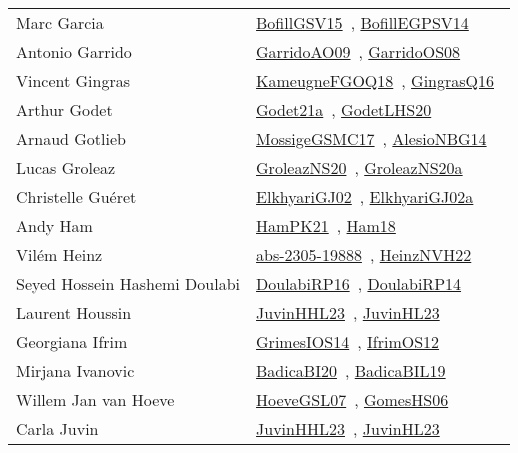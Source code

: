 {\begin{longtable}{p{4cm}p{20cm}}
Marc Garcia & \href{works/BofillGSV15.pdf}{BofillGSV15}~\cite{BofillGSV15}, \href{works/BofillEGPSV14.pdf}{BofillEGPSV14}~\cite{BofillEGPSV14}\\
Antonio Garrido & \href{works/GarridoAO09.pdf}{GarridoAO09}~\cite{GarridoAO09}, \href{works/GarridoOS08.pdf}{GarridoOS08}~\cite{GarridoOS08}\\
Vincent Gingras & \href{works/KameugneFGOQ18.pdf}{KameugneFGOQ18}~\cite{KameugneFGOQ18}, \href{works/GingrasQ16.pdf}{GingrasQ16}~\cite{GingrasQ16}\\
Arthur Godet & \href{}{Godet21a}~\cite{Godet21a}, \href{works/GodetLHS20.pdf}{GodetLHS20}~\cite{GodetLHS20}\\
Arnaud Gotlieb & \href{works/MossigeGSMC17.pdf}{MossigeGSMC17}~\cite{MossigeGSMC17}, \href{works/AlesioNBG14.pdf}{AlesioNBG14}~\cite{AlesioNBG14}\\
Lucas Groleaz & \href{works/GroleazNS20.pdf}{GroleazNS20}~\cite{GroleazNS20}, \href{works/GroleazNS20a.pdf}{GroleazNS20a}~\cite{GroleazNS20a}\\
Christelle Gu{\'{e}}ret & \href{works/ElkhyariGJ02.pdf}{ElkhyariGJ02}~\cite{ElkhyariGJ02}, \href{works/ElkhyariGJ02a.pdf}{ElkhyariGJ02a}~\cite{ElkhyariGJ02a}\\
Andy Ham & \href{works/HamPK21.pdf}{HamPK21}~\cite{HamPK21}, \href{works/Ham18.pdf}{Ham18}~\cite{Ham18}\\
Vil{\'{e}}m Heinz & \href{works/abs-2305-19888.pdf}{abs-2305-19888}~\cite{abs-2305-19888}, \href{works/HeinzNVH22.pdf}{HeinzNVH22}~\cite{HeinzNVH22}\\
Seyed Hossein Hashemi Doulabi & \href{works/DoulabiRP16.pdf}{DoulabiRP16}~\cite{DoulabiRP16}, \href{works/DoulabiRP14.pdf}{DoulabiRP14}~\cite{DoulabiRP14}\\
Laurent Houssin & \href{works/JuvinHHL23.pdf}{JuvinHHL23}~\cite{JuvinHHL23}, \href{works/JuvinHL23.pdf}{JuvinHL23}~\cite{JuvinHL23}\\
Georgiana Ifrim & \href{works/GrimesIOS14.pdf}{GrimesIOS14}~\cite{GrimesIOS14}, \href{works/IfrimOS12.pdf}{IfrimOS12}~\cite{IfrimOS12}\\
Mirjana Ivanovic & \href{works/BadicaBI20.pdf}{BadicaBI20}~\cite{BadicaBI20}, \href{works/BadicaBIL19.pdf}{BadicaBIL19}~\cite{BadicaBIL19}\\
Willem Jan van Hoeve & \href{works/HoeveGSL07.pdf}{HoeveGSL07}~\cite{HoeveGSL07}, \href{works/GomesHS06.pdf}{GomesHS06}~\cite{GomesHS06}\\
Carla Juvin & \href{works/JuvinHHL23.pdf}{JuvinHHL23}~\cite{JuvinHHL23}, \href{works/JuvinHL23.pdf}{JuvinHL23}~\cite{JuvinHL23}\\

\end{longtable}}
